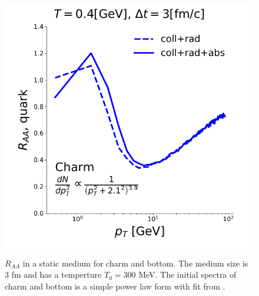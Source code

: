\documentclass[aps, prc, reprint, amsmath, groupedaddress, nofootinbib]{revtex4-1}
\begin{document}
\begin{figure}
\includegraphics[width=\columnwidth]{BoxRaa.pdf}
\caption{$R_{AA}$ in a static medium for charm and bottom. The medium size  is $3$ fm and has a temperture $T_0 = 300$ MeV. The initial spectra of charm and bottom is a simple power law form with fit from \cite{Cao:2012jt}.}\label{plots:BoxRaa}
\end{figure}
\end{document}
